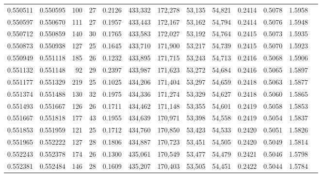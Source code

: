 \begin{tabular}{rrrrrrrrrrrrr}
0.550511 & 0.550595 &    100 &    27 &                                     0.2126 & 433,332 & 172,278 &  53,135 &  54,821 & 0.2414 & 0.5078 & 1.5958 \\
0.550597 & 0.550670 &    111 &    27 &                                     0.1957 & 433,443 & 172,167 &  53,162 &  54,794 & 0.2414 & 0.5076 & 1.5948 \\
0.550712 & 0.550859 &    140 &    30 &                                     0.1765 & 433,583 & 172,027 &  53,192 &  54,764 & 0.2415 & 0.5073 & 1.5935 \\
0.550873 & 0.550938 &    127 &    25 &                                     0.1645 & 433,710 & 171,900 &  53,217 &  54,739 & 0.2415 & 0.5070 & 1.5923 \\
0.550949 & 0.551118 &    185 &    26 &                                     0.1232 & 433,895 & 171,715 &  53,243 &  54,713 & 0.2416 & 0.5068 & 1.5906 \\
0.551132 & 0.551148 &     92 &    29 &                                     0.2397 & 433,987 & 171,623 &  53,272 &  54,684 & 0.2416 & 0.5065 & 1.5897 \\
0.551177 & 0.551329 &    219 &    25 &                                     0.1025 & 434,206 & 171,404 &  53,297 &  54,659 & 0.2418 & 0.5063 & 1.5877 \\
0.551374 & 0.551488 &    130 &    32 &                                     0.1975 & 434,336 & 171,274 &  53,329 &  54,627 & 0.2418 & 0.5060 & 1.5865 \\
0.551493 & 0.551667 &    126 &    26 &                                     0.1711 & 434,462 & 171,148 &  53,355 &  54,601 & 0.2419 & 0.5058 & 1.5853 \\
0.551667 & 0.551818 &    177 &    43 &                                     0.1955 & 434,639 & 170,971 &  53,398 &  54,558 & 0.2419 & 0.5054 & 1.5837 \\
0.551853 & 0.551959 &    121 &    25 &                                     0.1712 & 434,760 & 170,850 &  53,423 &  54,533 & 0.2420 & 0.5051 & 1.5826 \\
0.551965 & 0.552222 &    127 &    28 &                                     0.1806 & 434,887 & 170,723 &  53,451 &  54,505 & 0.2420 & 0.5049 & 1.5814 \\
0.552243 & 0.552378 &    174 &    26 &                                     0.1300 & 435,061 & 170,549 &  53,477 &  54,479 & 0.2421 & 0.5046 & 1.5798 \\
0.552381 & 0.552484 &    146 &    28 &                                     0.1609 & 435,207 & 170,403 &  53,505 &  54,451 & 0.2422 & 0.5044 & 1.5784 \\

\end{tabular}
